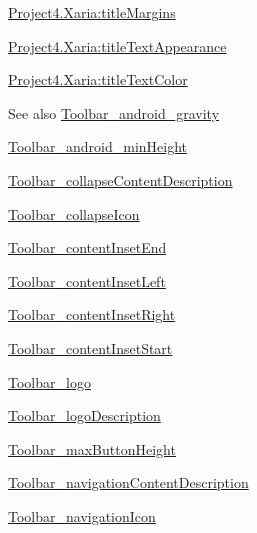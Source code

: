 {\ttfamily \hyperlink{classproject4_1_1xaria_1_1R_1_1styleable_aad3d076117cb0923a57bf3c96cc0a6d5}{Project4.\+Xaria\+:title\+Margins}}

{\ttfamily \hyperlink{classproject4_1_1xaria_1_1R_1_1styleable_ab0deb931fcb51a59a9c57d317339ad4d}{Project4.\+Xaria\+:title\+Text\+Appearance}}

{\ttfamily \hyperlink{classproject4_1_1xaria_1_1R_1_1styleable_ae59bec88cab4e203af7c4a6242b338ed}{Project4.\+Xaria\+:title\+Text\+Color}}

\begin{DoxySeeAlso}{See also}
\hyperlink{classproject4_1_1xaria_1_1R_1_1styleable_aaa01afab589b8e590f5d025a28cf7404}{Toolbar\+\_\+android\+\_\+gravity} 

\hyperlink{classproject4_1_1xaria_1_1R_1_1styleable_ac5a3d253c3d18c7ab741bcfc47232df4}{Toolbar\+\_\+android\+\_\+min\+Height} 

\hyperlink{classproject4_1_1xaria_1_1R_1_1styleable_a98b1b074efe3a521e01cbddeaaf5da0f}{Toolbar\+\_\+collapse\+Content\+Description} 

\hyperlink{classproject4_1_1xaria_1_1R_1_1styleable_a2cf454b5f11a8dc6f39c763c9a877b20}{Toolbar\+\_\+collapse\+Icon} 

\hyperlink{classproject4_1_1xaria_1_1R_1_1styleable_a57f6aadbc973e24685a86eedaafd5f4c}{Toolbar\+\_\+content\+Inset\+End} 

\hyperlink{classproject4_1_1xaria_1_1R_1_1styleable_a2660e1510b54665063d64211023b050f}{Toolbar\+\_\+content\+Inset\+Left} 

\hyperlink{classproject4_1_1xaria_1_1R_1_1styleable_a52a6ed0d0c3dfe919f77ed1729daf3f9}{Toolbar\+\_\+content\+Inset\+Right} 

\hyperlink{classproject4_1_1xaria_1_1R_1_1styleable_a9834196c2626e358f21cf55efd25f27c}{Toolbar\+\_\+content\+Inset\+Start} 

\hyperlink{classproject4_1_1xaria_1_1R_1_1styleable_a56c0b377a7daf8828ad9a239006baaaf}{Toolbar\+\_\+logo} 

\hyperlink{classproject4_1_1xaria_1_1R_1_1styleable_ac4c21d9b696d419fa766694469674d1f}{Toolbar\+\_\+logo\+Description} 

\hyperlink{classproject4_1_1xaria_1_1R_1_1styleable_a737f7e13fbcddd0d8f2c90ce3066e375}{Toolbar\+\_\+max\+Button\+Height} 

\hyperlink{classproject4_1_1xaria_1_1R_1_1styleable_a7ce219ac5cd9c8b9b55a133796302f54}{Toolbar\+\_\+navigation\+Content\+Description} 

\hyperlink{classproject4_1_1xaria_1_1R_1_1styleable_a857db4b68c78808f5d7aff17e497b305}{Toolbar\+\_\+navigation\+Icon} 


\end{DoxySeeAlso}
